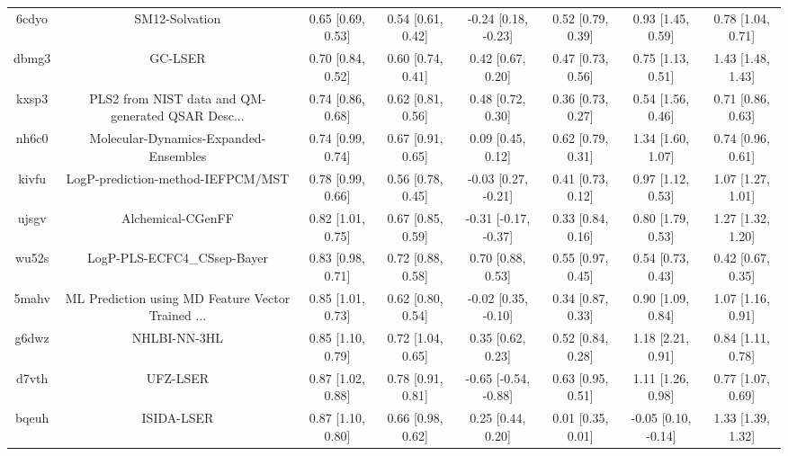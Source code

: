 \documentclass{article}
\begin{document}
\begin{center}
\begin{longtable}{|cccccccc|}
 6cdyo &                                     SM12-Solvation &  0.65 [0.69, 0.53] &  0.54 [0.61, 0.42] &   -0.24 [0.18, -0.23] &  0.52 [0.79, 0.39] &     0.93 [1.45, 0.59] &     0.78 [1.04, 0.71] \\
 dbmg3 &                                            GC-LSER &  0.70 [0.84, 0.52] &  0.60 [0.74, 0.41] &     0.42 [0.67, 0.20] &  0.47 [0.73, 0.56] &     0.75 [1.13, 0.51] &     1.43 [1.48, 1.43] \\
 kxsp3 &  PLS2 from NIST data and QM-generated QSAR Desc... &  0.74 [0.86, 0.68] &  0.62 [0.81, 0.56] &     0.48 [0.72, 0.30] &  0.36 [0.73, 0.27] &     0.54 [1.56, 0.46] &     0.71 [0.86, 0.63] \\
 nh6c0 &              Molecular-Dynamics-Expanded-Ensembles &  0.74 [0.99, 0.74] &  0.67 [0.91, 0.65] &     0.09 [0.45, 0.12] &  0.62 [0.79, 0.31] &     1.34 [1.60, 1.07] &     0.74 [0.96, 0.61] \\
 kivfu &                  LogP-prediction-method-IEFPCM/MST &  0.78 [0.99, 0.66] &  0.56 [0.78, 0.45] &   -0.03 [0.27, -0.21] &  0.41 [0.73, 0.12] &     0.97 [1.12, 0.53] &     1.07 [1.27, 1.01] \\
 ujsgv &                                  Alchemical-CGenFF &  0.82 [1.01, 0.75] &  0.67 [0.85, 0.59] &  -0.31 [-0.17, -0.37] &  0.33 [0.84, 0.16] &     0.80 [1.79, 0.53] &     1.27 [1.32, 1.20] \\
 wu52s &                        LogP-PLS-ECFC4\_CSsep-Bayer &  0.83 [0.98, 0.71] &  0.72 [0.88, 0.58] &     0.70 [0.88, 0.53] &  0.55 [0.97, 0.45] &     0.54 [0.73, 0.43] &     0.42 [0.67, 0.35] \\
 5mahv &  ML Prediction using MD Feature Vector Trained ... &  0.85 [1.01, 0.73] &  0.62 [0.80, 0.54] &   -0.02 [0.35, -0.10] &  0.34 [0.87, 0.33] &     0.90 [1.09, 0.84] &     1.07 [1.16, 0.91] \\
 g6dwz &                                       NHLBI-NN-3HL &  0.85 [1.10, 0.79] &  0.72 [1.04, 0.65] &     0.35 [0.62, 0.23] &  0.52 [0.84, 0.28] &     1.18 [2.21, 0.91] &     0.84 [1.11, 0.78] \\
 d7vth &                                           UFZ-LSER &  0.87 [1.02, 0.88] &  0.78 [0.91, 0.81] &  -0.65 [-0.54, -0.88] &  0.63 [0.95, 0.51] &     1.11 [1.26, 0.98] &     0.77 [1.07, 0.69] \\
 bqeuh &                                         ISIDA-LSER &  0.87 [1.10, 0.80] &  0.66 [0.98, 0.62] &     0.25 [0.44, 0.20] &  0.01 [0.35, 0.01] &   -0.05 [0.10, -0.14] &     1.33 [1.39, 1.32] \\

\end{longtable}
\end{center}
\end{document}
